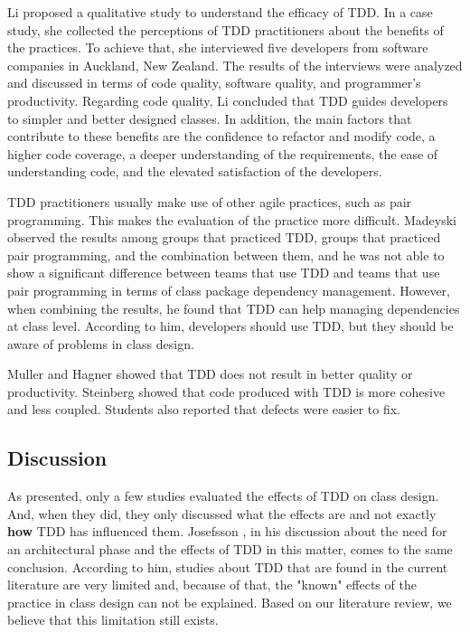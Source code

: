 \documentclass[times]{elsarticle}
\begin{document}
Li \cite{angela-li} proposed a qualitative study to understand the efficacy of TDD.
In a case study, she collected the perceptions of TDD practitioners about the
benefits of the practices. To achieve that, she interviewed five developers
from software companies in Auckland, New Zealand. The results of the interviews
were analyzed and discussed in terms of code quality, software quality, and
programmer's productivity. Regarding code quality, Li concluded that TDD
guides developers to simpler and better designed classes. In addition, the main
factors that contribute to these benefits are the confidence to refactor and
modify code, a higher code coverage, a deeper understanding of the requirements,
the ease of understanding code, and the elevated
satisfaction of the developers.

TDD practitioners usually make use of other agile practices, such as
pair programming. This makes the evaluation of the practice more difficult.
Madeyski \cite{madeyski-package-dependencies} observed the results
among groups that practiced TDD, groups that practiced pair programming,
and the combination between them, and he was not able to show a significant
difference between teams that use TDD and teams that use pair programming
in terms of class package dependency management. However, when combining
the results, he found that TDD can help managing dependencies at class level.
According to him, developers should use TDD, but they should be aware of 
problems in class design.

Muller and Hagner \cite{muller-e-hagner} showed that TDD does not result in
better quality or productivity. Steinberg \cite{steinberg} showed that
code produced with TDD is more cohesive and less coupled. Students also reported
that defects were easier to fix.

\subsection{Discussion}

As presented, only a few studies evaluated the effects of TDD on class design.
And, when they did, they only discussed what the effects are and not exactly
\textbf{how} TDD has influenced them. Josefsson \cite{josefsson}, in his discussion
about the need for an architectural phase and the effects of TDD in this matter,
comes to the same conclusion. According to him, studies about TDD that are
found in the current literature are very limited and, because of that, the
"known" effects of the practice in class design can not be explained. Based on
our literature review, we believe that this limitation still exists.
\end{document}
